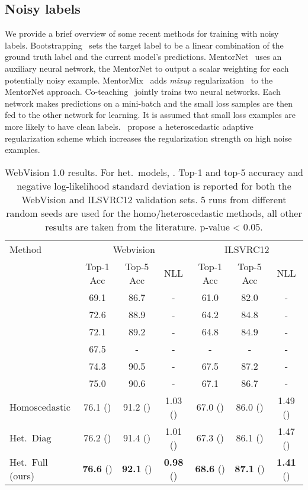 \documentclass[final]{cvpr}
\begin{document}
\subsection{Noisy labels}

We provide a brief overview of some recent methods for training with noisy labels. Bootstrapping~\cite{reed6596training} sets the target label to be a linear combination of the ground truth label and the current model's predictions. MentorNet~\cite{MentorNet.2018} uses an auxiliary neural network, the MentorNet to output a scalar weighting for each potentially noisy example. MentorMix~\cite{jiang2020beyond} adds \textit{mixup} regularization~\cite{zhang2018mixup} to the MentorNet approach. Co-teaching~\cite{CoTeaching.2018} jointly trains two neural networks. Each network makes predictions on a mini-batch and the small loss samples are then fed to the other network for learning. It is assumed that small loss examples are more likely to have clean labels.~\citet{cao2020heteroskedastic} propose a heteroscedastic adaptive regularization scheme which increases the regularization strength on high noise examples.

\begin{table*}[tbh]
\centering
\begin{tabular}{lcccccc}
\toprule
Method &
  \multicolumn{3}{c}{Webvision} &
  \multicolumn{3}{c}{ILSVRC12} \\
 & Top-1 Acc & Top-5 Acc & NLL & Top-1 Acc & Top-5 Acc & NLL \\
\midrule
\citet{lee2018cleannet} & 69.1 & 86.7 & - & 61.0 & 82.0 & - \\
\citet{MentorNet.2018} & 72.6 & 88.9 & - & 64.2 & 84.8 & - \\
\citet{guo2018curriculumnet} & 72.1 & 89.2 & - & 64.8 & 84.9 & - \\
\citet{saxena2019data} & 67.5 & - & - & - & - & - \\
\citet{jiang2020beyond} & 74.3 & 90.5 & - & 67.5 & 87.2 & - \\
\citet{cao2020heteroskedastic} & 75.0 & 90.6 & - & 67.1 & 86.7 & - \\
\midrule
Homoscedastic & 76.1 () & 91.2 () & 1.03 () & 67.0 () & 86.0 () & 1.49 () \\
Het.\ Diag~\cite{collier2020analysis} & 76.2 () & 91.4 () & 1.01 () & 67.3 () & 86.1 () & 1.47 ()\\ 
Het.\ Full (ours) & \textbf{76.6} () & \textbf{92.1} () & \textbf{0.98} () & \textbf{68.6} () & \textbf{87.1} () & \textbf{1.41} ()\\ 
\bottomrule
\end{tabular}
\caption{WebVision 1.0 results. For het.\ models, . Top-1 and top-5 accuracy and negative log-likelihood  standard deviation is reported for both the WebVision and ILSVRC12 validation sets. 5 runs from different random seeds are used for the homo/heteroscedastic methods, all other results are taken from the literature.  p-value < 0.05.}
\label{table:webvision}
\end{table*}
\end{document}
